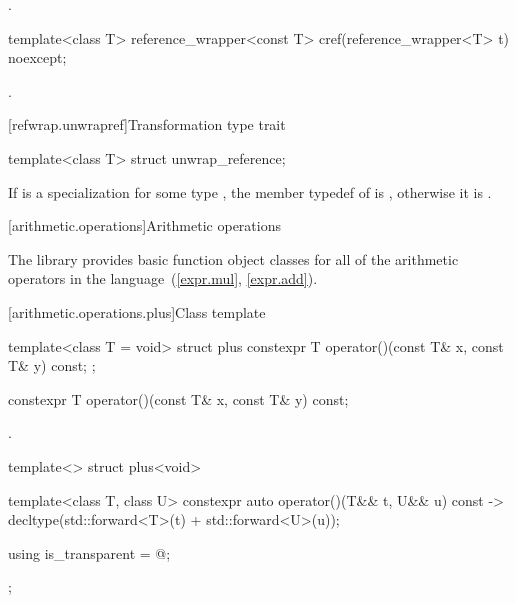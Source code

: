 \begin{itemdescr}
\pnum\returns {}.
\end{itemdescr}

%
\begin{itemdecl}
template<class T> reference_wrapper<const T> cref(reference_wrapper<T> t) noexcept;
\end{itemdecl}

\begin{itemdescr}
\pnum\returns {}.
\end{itemdescr}

[refwrap.unwrapref]{Transformation type trait }

%
\begin{itemdecl}
template<class T>
  struct unwrap_reference;
\end{itemdecl}

\pnum
If  is
a specialization  for some type ,
the member typedef  of  is ,
otherwise it is .

[arithmetic.operations]{Arithmetic operations}

\pnum
The library provides basic function object classes for all of the arithmetic
operators in the language~(\ref{expr.mul}, \ref{expr.add}).

[arithmetic.operations.plus]{Class template }

%
\begin{itemdecl}
template<class T = void> struct plus {
  constexpr T operator()(const T& x, const T& y) const;
};
\end{itemdecl}

%
\begin{itemdecl}
constexpr T operator()(const T& x, const T& y) const;
\end{itemdecl}

\begin{itemdescr}
\pnum\returns {}.
\end{itemdescr}

%
\begin{itemdecl}
template<> struct plus<void> {
  template<class T, class U> constexpr auto operator()(T&& t, U&& u) const
    -> decltype(std::forward<T>(t) + std::forward<U>(u));

  using is_transparent = @\unspec@;
};
\end{itemdecl}

